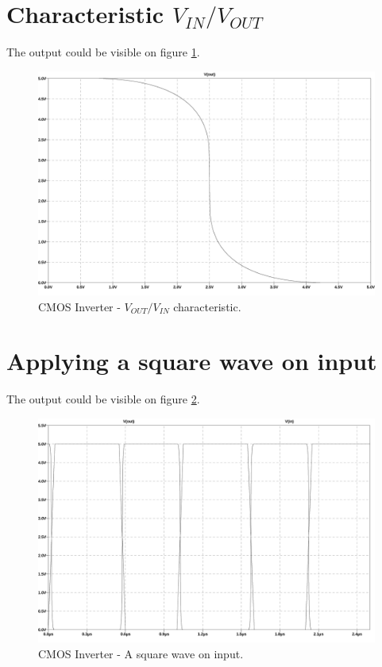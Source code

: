 \section{Characteristic $V_{IN}/V_{OUT}$}

The output could be visible on figure \ref{characteristic}.
\begin{figure}[H]
  \centering
  \includegraphics[width=14cm]{graph/CMOSInverter/Characteristic.jpg}
  \caption{CMOS Inverter - $V_{OUT}/V_{IN}$ characteristic.}
  \label{characteristic}
\end{figure}

\section{Applying a square wave on input}

The output could be visible on figure \ref{SquareWave}.
\begin{figure}[H]
  \centering
  \includegraphics[width=14cm]{graph/CMOSInverter/SquareWave.jpg}
  \caption{CMOS Inverter - A square wave on input.}
  \label{SquareWave}
\end{figure}

